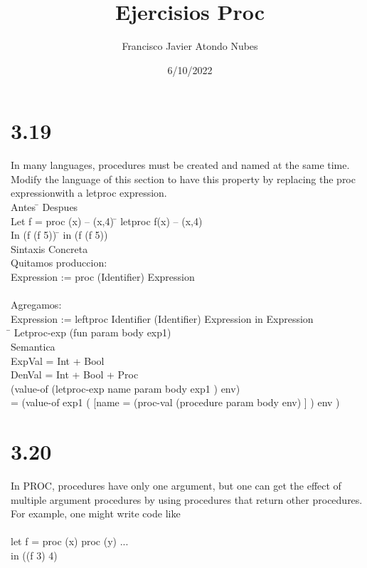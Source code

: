 \documentclass{article}
\title{Ejercisios Proc}
\author{Francisco Javier Atondo Nubes }
\date{6/10/2022}
\begin{document}
\maketitle

\begin{tab}

\section{3.19}


In many languages, procedures must be created and named at the
same time. Modify the language of this section to have this property by replacing the
proc expressionwith a letproc expression.\\


    Antes \= \> \> \> \> \> \> \> \> \> \> \> \> \> Despues\\
    Let f = proc (x) – (x,4) \= \> \> letproc f(x) – (x,4)\\
    In (f (f 5)) \= \> \> \> \> \> \> \> \> \> \> \> \> in (f (f 5))\\




Sintaxis Concreta\\
Quitamos produccion:\\
Expression := proc (Identifier) Expression\\ \\
Agregamos:\\
Expression := leftproc Identifier (Identifier) Expression in Expression\\
\= \>	Letproc-exp (fun param body exp1)\\

Semantica\\
ExpVal = Int + Bool\\
DenVal = Int + Bool + Proc\\
(value-of (letproc-exp name param body exp1 ) env)\\
= (value-of exp1 ( [name = (proc-val (procedure param body env) ] ) env )\\
\newpage
\section{3.20}

In PROC, procedures have only one argument, but one can get the effect of multiple argument procedures by using procedures that return other procedures. For example, one might write code like\\ \\
let f = proc (x) proc (y) ...\\
in ((f 3) 4)\\ \\


\end{tab}
\end{document}
